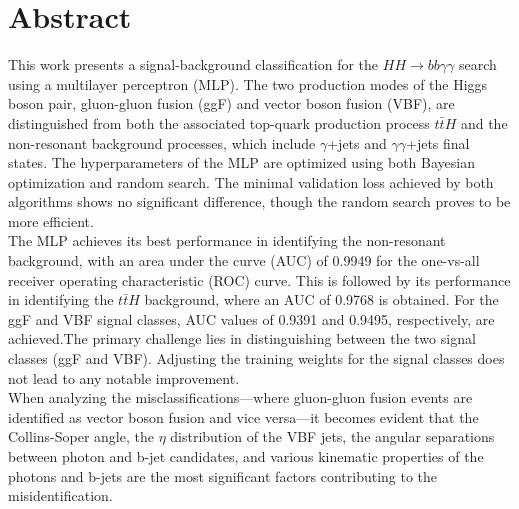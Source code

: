 \section*{Abstract}

This work presents a signal-background classification for the $HH \rightarrow bb \gamma \gamma$ search using a multilayer perceptron (MLP).
The two production modes of the Higgs boson pair, gluon-gluon fusion (ggF) and vector boson fusion (VBF), are distinguished from both the associated
top-quark production process $t \bar{t} H$ and the non-resonant background processes, which include $\gamma$+jets and $\gamma \gamma$+jets final states.
The hyperparameters of the MLP are optimized using both Bayesian optimization and random search. The minimal validation loss achieved by both algorithms
shows no significant difference, though the random search proves to be more efficient. \\

The MLP achieves its best performance in identifying the non-resonant background, with an area under the curve (AUC) of 0.9949 for the one-vs-all
receiver operating characteristic (ROC) curve. This is followed by its performance in identifying the $t \bar{t} H$ background,
where an AUC of 0.9768 is obtained.
For the ggF and VBF signal classes, AUC values of 0.9391 and 0.9495, respectively, are achieved.The primary challenge lies in distinguishing between the two
signal classes (ggF and VBF).
Adjusting the training weights for the signal classes does not lead to any notable improvement. \\

When analyzing the misclassifications—where gluon-gluon fusion events are identified as vector boson fusion and vice versa—it becomes evident
that the Collins-Soper angle, the $\eta$ distribution of the VBF jets, the angular separations between photon and b-jet candidates, and various
kinematic properties of the photons and b-jets are the most significant factors contributing to the misidentification.